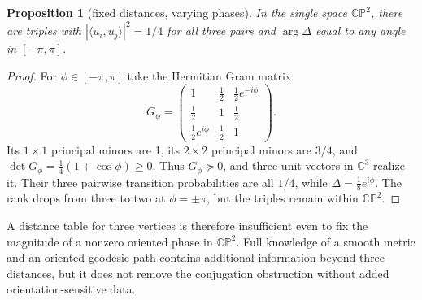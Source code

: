 \documentclass[11pt,a4paper]{article}
\newtheorem{proposition}[theorem]{Proposition}
\newcommand{\CP}{\mathbb{CP}}
\begin{document}
\begin{proposition}[fixed distances, varying phases]\label{prop:gram}
In the single space \(\CP^2\), there are triples with \( |\langle u_i,u_j\rangle|^2=1/4\) for all three pairs and \(\arg\Delta\) equal to \emph{any} angle in \([ -\pi,\pi]\).
\end{proposition}
\begin{proof}
For \(\phi\in[-\pi,\pi]\) take the Hermitian Gram matrix
\[
G_\phi=\begin{pmatrix}
1&\frac12&\frac12e^{-i\phi}\\
\frac12&1&\frac12\\
\frac12e^{i\phi}&\frac12&1
\end{pmatrix}.
\]
Its \(1\times1\) principal minors are 1, its \(2\times2\) principal minors are \(3/4\), and
\(\det G_\phi=\frac14(1+\cos\phi)\geq0\). Thus \(G_\phi\succeq0\), and three unit vectors in \(\mathbb C^3\) realize it. Their three pairwise transition probabilities are all \(1/4\), while \(\Delta=\tfrac18e^{i\phi}\). The rank drops from three to two at \(\phi=\pm\pi\), but the triples remain within \(\CP^2\).
\end{proof}

A distance table for three vertices is therefore insufficient even to fix the magnitude of a nonzero oriented phase in \(\CP^2\). Full knowledge of a smooth metric and an oriented geodesic path contains additional information beyond three distances, but it does not remove the conjugation obstruction without added orientation-sensitive data.
\end{document}

